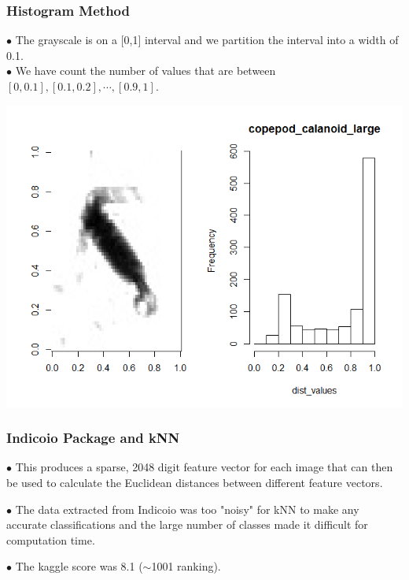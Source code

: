 \documentclass{beamer}
\begin{document}
\begin{frame}
	\frametitle{Histogram Method}
	$\bullet$ The grayscale is on a [0,1] interval and we partition the interval into a width of 0.1.\\
	$\bullet$ We have count the number of values that are between $[0,0.1],[0.1,0.2],\cdots, [0.9,1]$.\\ 
	\begin{center}
		\includegraphics[scale=0.3]{bin_method.png}
	\end{center}
\end{frame}
\begin{frame}
	\frametitle{Indicoio Package and kNN}
$\bullet$ This produces a sparse, 2048 digit feature vector for each image that can then be used to calculate the Euclidean distances between different feature vectors.\vskip 12pt

$\bullet$ The data extracted from Indicoio was too "noisy" for kNN to make any accurate classifications and the large number of classes made it difficult for computation time. \vskip 12pt

$\bullet$ The kaggle score was 8.1 ($\sim$1001 ranking).

\end{frame}

\end{document}
